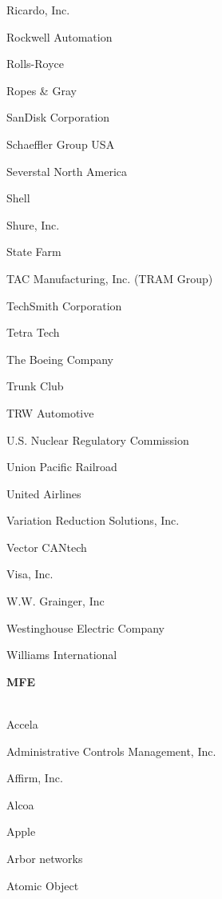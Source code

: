 \documentclass[twoside]{article}
\begin{document}
\begin{center}
\begin{multicols}{5}
\begin{FlushLeft}
\begin{compactitem}
\item Ricardo, Inc.
\item Rockwell Automation
\item Rolls-Royce
\item Ropes \& Gray
\item SanDisk Corporation
\item Schaeffler Group USA
\item Severstal North America
\item Shell
\item Shure, Inc.
\item State Farm
\item TAC Manufacturing, Inc. (TRAM Group)
\item TechSmith Corporation
\item Tetra Tech
\item The Boeing Company
\item Trunk Club
\item TRW Automotive
\item U.S. Nuclear Regulatory Commission
\item Union Pacific Railroad
\item United Airlines
\item Variation Reduction Solutions, Inc.
\item Vector CANtech
\item Visa, Inc.
\item W.W. Grainger, Inc
\item Westinghouse Electric Company
\item Williams International
\end{compactitem}
        \end{FlushLeft}
        \vspace{1em}
        {\fontsize{14}{16}\selectfont \bf MFE}\\
        \vspace{-1em}
        ~\hrulefill~
        \vspace{-.9em}
        \begin{FlushLeft}
        \begin{compactitem}
        \item Accela
\item Administrative Controls Management, Inc.
\item Affirm, Inc.
\item Alcoa
\item Apple
\item Arbor networks
\item Atomic Object

\end{compactitem}
\end{FlushLeft}
\end{multicols}
\end{center}
\end{document}
